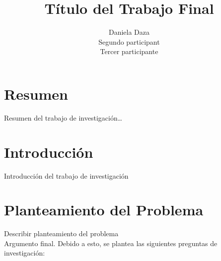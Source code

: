 \documentclass[oneside,11pt]{Latex/Classes/PhDthesisPSnPDF}
\title{Título del Trabajo Final}
\author{Daniela Daza \\ Segundo participant \\ Tercer participante}
\begin{document}
\maketitle

\frontmatter


\setcounter{secnumdepth}{3}
\setcounter{tocdepth}{3}

\tableofcontents



\cleardoublepage

  \cleardoublepage       %
  \chapter*{Resumen}     %
  
  Resumen del trabajo de
investigación\ldots{}             %
  
  \cleardoublepage

\mainmatter
\def\baselinestretch{1.5}

\chapter*{Introducción}

Introducción del trabajo de investigación

\chapter{Planteamiento del Problema}

Describir planteamiento del problema\\

Argumento final. Debido a esto, se plantea las siguientes preguntas de
investigación:\\
\end{document}
